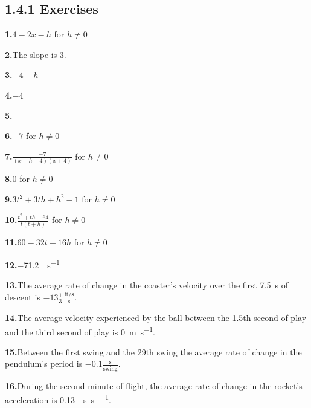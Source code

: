 \documentclass[12pt,]{book}
\theoremstyle{plain}
\theoremstyle{definition}
\theoremstyle{definition}
\theoremstyle{definition}
\theoremstyle{definition}
\theoremstyle{definition}
\numberwithin{equation}{section}
\begin{document}
\subsection*{1.4.1 Exercises}
\noindent\textbf{1.}\quad{}\(4-2x-h\) for \(h\neq0\)%
\par\smallskip
\noindent\textbf{2.}\quad{}The slope is \(3\).%
\par\smallskip
\noindent\textbf{3.}\quad{}\(-4-h\)%
\par\smallskip
\noindent\textbf{4.}\quad{}\(-4\)%
\par\smallskip
\noindent\textbf{5.}
\par\smallskip
\noindent\textbf{6.}\quad{}\(-7\) for \(h\neq0\)%
\par\smallskip
\noindent\textbf{7.}\quad{}\(\frac{-7}{(x+h+4)(x+4)}\) for \(h\neq0\)%
\par\smallskip
\noindent\textbf{8.}\quad{}\(0\) for \(h\neq0\)%
\par\smallskip
\noindent\textbf{9.}\quad{}\(3t^2+3th+h^2-1\) for \(h\neq0\)%
\par\smallskip
\noindent\textbf{10.}\quad{}\(\frac{t^2+th-64}{t(t+h)}\) for \(h\neq0\)%
\par\smallskip
\noindent\textbf{11.}\quad{}\(60-32t-16h\) for \(h\neq0\)%
\par\smallskip
\noindent\textbf{12.}\quad{}\SI{-71.2}{\foot\per\second}%
\par\smallskip
\noindent\textbf{13.}\quad{}The average rate of change in the coaster's velocity over the first \SI{7.5}{\second} of descent is \(-13\frac{1}{3}\,\frac{\text{ft/s}}{\text{s}}\).%
\par\smallskip
\noindent\textbf{14.}\quad{}The average velocity experienced by the ball between the 1.5th second of play and the third second of play is \SI{0}{\meter\per\second}.%
\par\smallskip
\noindent\textbf{15.}\quad{}Between the first swing and the 29th swing the average rate of change in the pendulum's period is \(-0.1\frac{\text{s}}{\text{swing}}\).%
\par\smallskip
\noindent\textbf{16.}\quad{}During the second minute of flight, the average rate of change in the rocket's acceleration is \SI{0.13}{\mileperhour\per\second\per\second}.%
\par\smallskip
\end{document}
